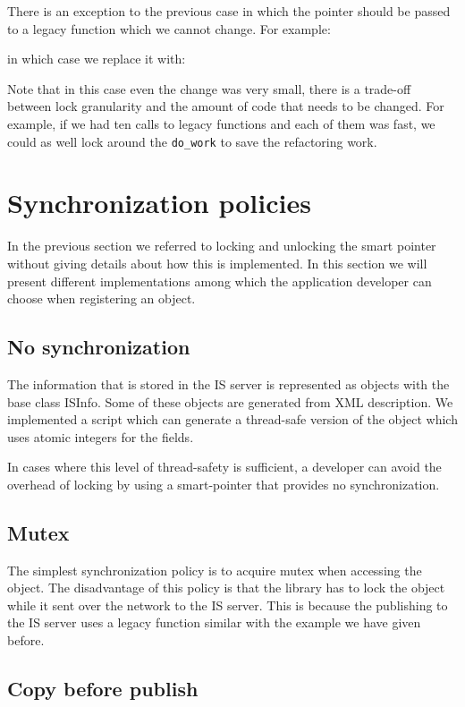 There is an exception to the previous case in which the pointer should be passed to a legacy function which we cannot change. For example:

in which case we replace it with:

Note that in this case even the change was very small, there is a trade-off between lock granularity and the amount of code that needs to be changed. For example, if we had ten calls to legacy functions and each of them was fast, we could as well lock around the \verb+do_work+ to save the refactoring work.

\section{Synchronization policies}

In the previous section we referred to locking and unlocking the smart pointer without giving details about how this is implemented. In this section we will present different implementations among which the application developer can choose when registering an object.

\subsection{No synchronization}

The information that is stored in the IS server is represented as objects with the base class ISInfo. Some of these objects are generated from XML description. We implemented a script which can generate a thread-safe version of the object which uses atomic integers for the fields. 

In cases where this level of thread-safety is sufficient, a developer can avoid the overhead of locking by using a smart-pointer that provides no synchronization.

\subsection{Mutex}

The simplest synchronization policy is to acquire mutex when accessing the object. The disadvantage of this policy is that the library has to lock the object while it sent over the network to the IS server. This is because the publishing to the IS server uses a legacy function similar with the example we have given before.

\subsection{Copy before publish}

